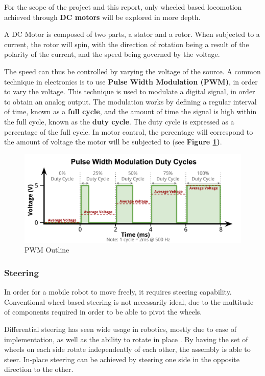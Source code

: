 \documentclass[12p,a4paper]{report}
\begin{document}
For the scope of the project and this report, only wheeled based locomotion achieved through \textbf{DC motors} will be explored in more depth.

A DC Motor is composed of two parts, a stator and a rotor. When subjected to a current, the rotor will spin, with the direction of rotation being a result of the polarity of the current, and the speed being governed by the voltage.

The speed can thus be controlled by varying the voltage of the source. A common technique in electronics is to use \textbf{Pulse Width Modulation (PWM)}, in order to vary the voltage. This technique is used to modulate a digital signal, in order to obtain an analog output. The modulation works by defining a regular interval of time, known as a \textbf{full cycle}, and the amount of time the signal is high within the full cycle, known as the \textbf{duty cycle}. The duty cycle is expressed as a percentage of the full cycle. In motor control, the percentage will correspond to the amount of voltage the motor will be subjected to (see \textbf{Figure \ref{fig:duty_cycle})}.

\begin{figure}[H]
\begin{center}
\includegraphics[scale=0.2]{duty_cycle}
\caption{PWM Outline \cite{duty_cycle}}
\label{fig:duty_cycle}
\end{center}
\end{figure}

\subsubsection{Steering}

In order for a mobile robot to move freely, it requires steering capability. Conventional wheel-based steering is not necessarily ideal, due to the multitude of components required in order to be able to pivot the wheels.

Differential steering has seen wide usage in robotics, mostly due to ease of implementation, as well as the ability to rotate in place \cite{diffsteering}. By having the set of wheels on each side rotate independently of each other, the assembly is able to steer. In-place steering can be achieved by steering one side in the opposite direction to the other.
\end{document}
